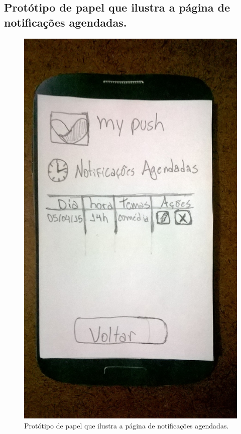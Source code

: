 \begin{anexosenv}
    \pagebreak
    \section*{Protótipo de papel que ilustra a página de notificações agendadas.}
    
      \begin{figure}[!htbp]
	\centering
	\includegraphics[scale=0.32, angle=-90]{editaveis/figuras/prototipo_papel_v1/notificacoes_agendadas}
	\caption{Protótipo de papel que ilustra a página de notificações agendadas.}
	\label{notificacoes_agendadas_v1}
      \end{figure}
    

\end{anexosenv}
